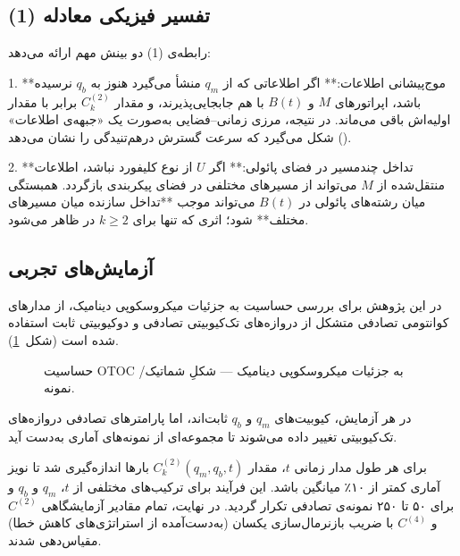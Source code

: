 \subsection{تفسیر فیزیکی معادله (1)}

رابطه‌ی (1) دو بینش مهم ارائه می‌دهد:

1. **موج‌پیشانی اطلاعات:**  
اگر اطلاعاتی که از \( q_m \) منشأ می‌گیرد هنوز به \( q_b \) نرسیده باشد، اپراتورهای \( M \) و \( B(t) \) با هم جابجایی‌پذیرند، و مقدار \( C^{(2)}_k \) برابر با مقدار اولیه‌اش باقی می‌ماند.  
در نتیجه، مرزی زمانی–فضایی به‌صورت یک «جبهه‌ی اطلاعات» () شکل می‌گیرد که سرعت گسترش درهم‌تنیدگی را نشان می‌دهد.

2. **تداخل چندمسیر در فضای پائولی:**  
اگر \( U \) از نوع کلیفورد نباشد، اطلاعات منتقل‌شده از \( M \) می‌تواند از مسیرهای مختلفی در فضای پیکربندی بازگردد. همبستگی میان رشته‌های پائولی در \( B(t) \) می‌تواند موجب **تداخل سازنده میان مسیرهای مختلف** شود؛ اثری که تنها برای \( k \ge 2 \) در  ظاهر می‌شود.

\subsection{آزمایش‌های تجربی}

در این پژوهش برای بررسی حساسیت  به جزئیات میکروسکوپی دینامیک، از مدارهای کوانتومی تصادفی متشکل از دروازه‌های تک‌کیوبیتی تصادفی و دوکیوبیتی ثابت استفاده شده است (شکل~\ref{fig2}).  

\begin{figure}[htbp]
	\centering
	\caption{حساسیت OTOC به جزئیات میکروسکوپی دینامیک — شکلِ شماتیک/نمونه.}
	\label{fig2}
\end{figure}
در هر آزمایش، کیوبیت‌های \( q_m \) و \( q_b \) ثابت‌اند، اما پارامترهای تصادفی دروازه‌های تک‌کیوبیتی تغییر داده می‌شوند تا مجموعه‌ای از نمونه‌های آماری به‌دست آید.

برای هر طول مدار زمانی \( t \)، مقدار \( C^{(2)}_k(q_m, q_b, t) \) بارها اندازه‌گیری شد تا نویز آماری کمتر از ۱۰٪ میانگین باشد.  
این فرآیند برای ترکیب‌های مختلفی از \( t \)، \( q_m \) و \( q_b \) و برای ۵۰ تا ۲۵۰ نمونه‌ی تصادفی تکرار گردید.  
در نهایت، تمام مقادیر آزمایشگاهی \( C^{(2)} \) و \( C^{(4)} \) با ضریب بازنرمال‌سازی یکسان (به‌دست‌آمده از استراتژی‌های کاهش خطا) مقیاس‌دهی شدند.

